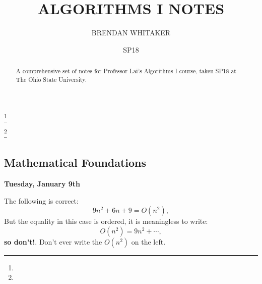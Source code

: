 \documentclass[reqno]{amsbook}
\theoremstyle{plain}
\numberwithin{section}{chapter}
\numberwithin{equation}{chapter}
\theoremstyle{definition}
\theoremstyle{remark}
\begin{document}
\frontmatter

\title{ALGORITHMS I NOTES}


\author{BRENDAN WHITAKER}
\address{}
\curraddr{}
\email{}
\thanks{}

\author{}
\address{}
\curraddr{}
\email{}
\thanks{}


\keywords{}

\date{SP18}

\begin{abstract}
A comprehensive set of notes for Professor Lai's Algorithms I course, taken SP18 at The Ohio State University. 
\end{abstract}

\maketitle


\setcounter{page}{4}

\tableofcontents

%



\mainmatter
%
\setcounter{part}{0}
\part{}
\setcounter{chapter}{0}
\chapter{Mathematical Foundations}

\textbf{Tuesday, January 9th}

The following is correct: 
$$
9n^2 + 6n + 9 = O(n^2),
$$
But the equality in this case is ordered, it is meaningless to write: 
$$
O(n^2) = 9n^2 + \cdots,
$$
\textbf{so don't!}. Don't ever write the $O(n^2)$ on the left. 
\end{document}
